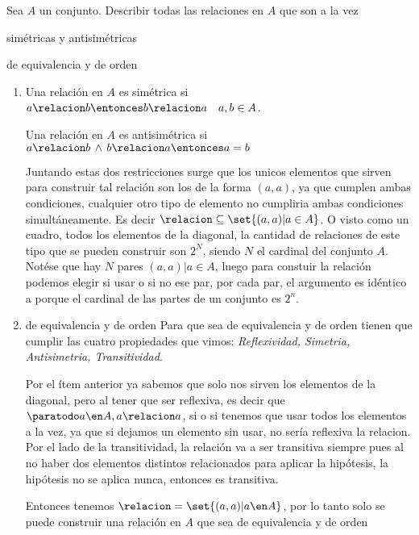 \begin{enunciado}{\ejercicio}
  Sea $A$ un conjunto. Describir todas las relaciones en $A$ que son a la vez
  \begin{enumerate}[label=\roman*)]
    \begin{multicols}{2}
      \item simétricas y antisimétricas
      \item de equivalencia y de orden
    \end{multicols}
  \end{enumerate}
\end{enunciado}

\begin{enumerate}[label=\roman*)]
  \item
        Una relación en $A$ es simétrica si $a \relacion b \entonces b \relacion a \quad a,b \in A$.

        Una relación en $A$ es antisimétrica si $a \relacion b \, \land \, b \relacion a \entonces a = b$

        Juntando estas dos restricciones surge que los unicos elementos que sirven para construir tal relación son los de la forma
        $(a,a)$, ya que cumplen ambas condiciones, cualquier otro tipo de elemento no cumpliria ambas condiciones simultáneamente.
        Es decir $\relacion \subseteq \set{(a,a) | a \in A}$. O visto como un cuadro, todos los elementos de la diagonal, la cantidad
        de relaciones de este tipo que se pueden construir son $2^N$, siendo $N$ el cardinal del conjunto $A$. Notése que hay $N$ pares
        $(a,a) | a \in A$, luego para constuir la relación podemos elegir si usar o si no ese par, por cada par, el argumento es idéntico a porque
        el cardinal de las partes de un conjunto es $2^n$.

  \item de equivalencia y de orden
        Para que sea de equivalencia y de orden tienen que cumplir las cuatro propiedades que vimos: \textit{Reflexividad, Simetria, Antisimetria, Transitividad}.

        Por el ítem anterior ya sabemos que solo nos sirven los elementos de la diagonal,
        pero al tener que ser reflexiva, es decir que $\paratodo a \en A, a \relacion a$,
        si o si tenemos que usar todos los elementos a la vez, ya que si dejamos un elemento sin usar, no sería reflexiva la relacion.
        Por el lado de la transitividad, la relación va a ser transitiva siempre pues al no haber dos elementos distintos
        relacionados para aplicar la hipótesis, la hipótesis no se aplica nunca, entonces es transitiva.

        Entonces tenemos $\relacion = \set{(a,a) | a \en A}$, por lo tanto solo se puede construir una relación en $A$ que sea
        de equivalencia y de orden

\end{enumerate}

\begin{aportes}
  \item {}
\end{aportes}
